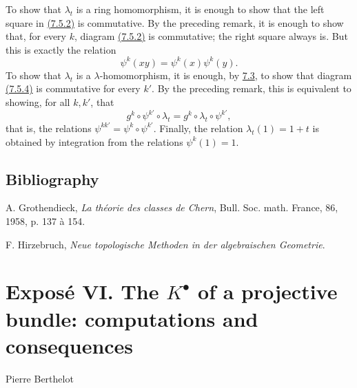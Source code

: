 To show that \(\lambda_t\) is a ring homomorphism, it is enough to show that the left square in \hyperlink{sga6.e05.eq.7-5-2}{(7.5.2)} is commutative. By the preceding remark, it is enough to show that, for every \(k\), diagram \hyperlink{sga6.e05.eq.7-5-2}{(7.5.2)} is commutative; the right square always is. But this is exactly the relation
\[
  \psi^k(xy)=\psi^k(x)\psi^k(y).
\]
To show that \(\lambda_t\) is a \(\lambda\)-homomorphism, it is enough, by \hyperlink{sga6.e05.para.7-3}{7.3}, to show that diagram \hyperlink{sga6.e05.eq.7-5-4}{(7.5.4)} is commutative for every \(k'\). By the preceding remark, this is equivalent to showing, for all \(k,k'\), that
\[
  g^k\circ\psi^{k'}\circ\lambda_t
  =
  g^k\circ\lambda_t\circ\psi^{k'},
\]
that is, the relations \(\psi^{kk'}=\psi^k\circ\psi^{k'}\). Finally, the relation \(\lambda_t(1)=1+t\) is obtained by integration from the relations \(\psi^k(1)=1\).

\subsection*{Bibliography}
\begin{enumerate}[label={[\arabic*]}]
\item A. Grothendieck, \emph{La théorie des classes de Chern}, Bull. Soc. math. France, 86, 1958, p. 137 à 154.
\item F. Hirzebruch, \emph{Neue topologische Methoden in der algebraischen Geometrie}.
\end{enumerate}



\providecommand{\Sym}{\operatorname{Sym}}
\providecommand{\Proj}{\operatorname{Proj}}
\providecommand{\Projz}{\operatorname{Proj}_0}
\providecommand{\Spec}{\operatorname{Spec}}
\providecommand{\Comp}{\operatorname{Comp}}
\providecommand{\Dplus}{D_{+}}
\providecommand{\id}{\operatorname{id}}
\providecommand{\cG}{\mathcal G}
\providecommand{\cA}{\mathcal A}
\providecommand{\cB}{\mathcal B}
\providecommand{\cL}{\mathscr L}
\providecommand{\cM}{\mathscr M}
\providecommand{\cN}{\mathscr N}
\providecommand{\cE}{\mathscr E}
\providecommand{\cK}{\mathscr K}
\providecommand{\cP}{\mathscr P}
\providecommand{\cQ}{\mathscr Q}
\providecommand{\OO}{\mathcal O}
\providecommand{\rk}{\operatorname{rk}}
\providecommand{\colim}{\operatorname*{colim}}


\section*{Exposé VI. The \(K^\bullet\) of a projective bundle: computations and consequences}
\begin{center}
Pierre Berthelot
\end{center}

